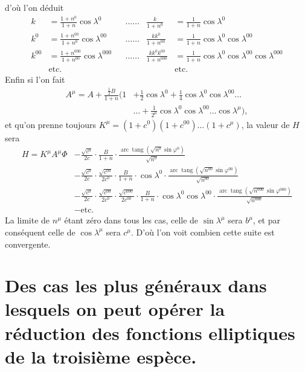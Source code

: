 \documentclass{article}
\begin{document}
d'où l'on déduit
\[ \begin{aligned} k&=\frac{1+n^{0}}{1+n}\cos\lambda^{0} &&\ldots\ldots & \frac{k}{1+n^{0}}&=\frac{1}{1+n}\cos\lambda^{0}\\ k^{0}&=\frac{1+n^{00}}{1+n^{0}}\cos\lambda^{00} &&\ldots\ldots & \frac{kk^{0}}{1+n^{00}}&=\frac{1}{1+n}\cos\lambda^{0}\cos\lambda^{00}\\ k^{00}&=\frac{1+n^{000}}{1+n^{00}}\cos\lambda^{000} &&\ldots\ldots & \frac{kk^{0}k^{00}}{1+n^{000}}&=\frac{1}{1+n}\cos\lambda^{0}\cos\lambda^{00}\cos\lambda^{000}\\ &\text{etc.} &&& &\text{etc.} \end{aligned} \]
Enfin si l'on fait
\[ \begin{aligned} A^{\mu}=A+\frac{\tfrac{1}{2}B}{1+n}(1&+\tfrac{1}{2}\cos\lambda^{0}+\tfrac{1}{4}\cos\lambda^{0}\cos\lambda^{00}\ldots\\ &\ldots+\frac{1}{2^{\mu}}\cos\lambda^{0}\cos\lambda^{00}\ldots\cos\lambda^{\mu}), \end{aligned} \]
et qu'on prenne toujours $K^{\mu}=(1+c^{0})(1+c^{00})\ldots(1+c^{\mu})$, la valeur de $H$ sera
\[ \begin{aligned} H=K^{\mu}A^{\mu}\Phi&-\frac{\sqrt{c^{0}}}{2c}\cdot\frac{B}{1+n}\cdot\frac{\operatorname{arc}\operatorname{tang}(\sqrt{n^{0}}\sin\varphi^{0})}{\sqrt{n^{0}}}\\ &-\frac{\sqrt{c^{0}}}{2c}\cdot\frac{\sqrt{c^{00}}}{2c^{0}}\cdot\frac{B}{1+n}\cdot\cos\lambda^{0}\cdot\frac{\operatorname{arc}\operatorname{tang}(\sqrt{n^{00}}\sin\varphi^{00})}{\sqrt{n^{00}}}\\ &-\frac{\sqrt{c^{0}}}{2c}\cdot\frac{\sqrt{c^{00}}}{2c^{0}}\cdot\frac{\sqrt{c^{000}}}{2c^{00}}\cdot\frac{B}{1+n}\cdot\cos\lambda^{0}\cos\lambda^{00}\cdot\frac{\operatorname{arc}\operatorname{tang}(\sqrt{n^{000}}\sin\varphi^{000})}{\sqrt{n^{000}}}\\ &-\text{etc.} \end{aligned} \]
La limite de $n^{\mu}$ étant zéro dans tous les cas, celle de $\sin\lambda^{\mu}$ sera $b^{\mu}$, et par conséquent celle de $\cos\lambda^{\mu}$ sera $c^{\mu}$. D'où l'on voit combien cette suite est convergente.

\section*{Des cas les plus généraux dans lesquels on peut opérer la réduction des fonctions elliptiques de la troisième espèce.}
\end{document}
